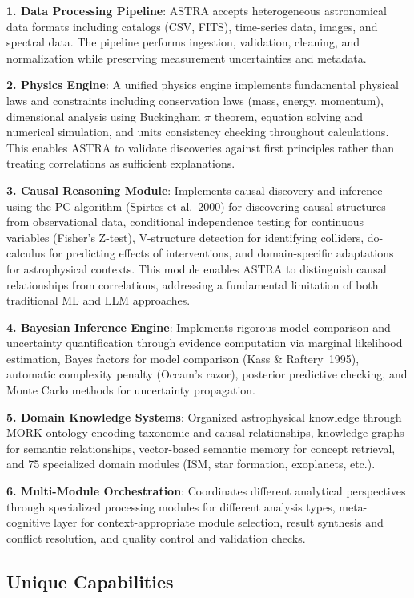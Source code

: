 \documentclass[usenatbib]{rasti}
\begin{document}
\textbf{1. Data Processing Pipeline}: ASTRA accepts heterogeneous astronomical data formats including catalogs (CSV, FITS), time-series data, images, and spectral data. The pipeline performs ingestion, validation, cleaning, and normalization while preserving measurement uncertainties and metadata.

\textbf{2. Physics Engine}: A unified physics engine implements fundamental physical laws and constraints including conservation laws (mass, energy, momentum), dimensional analysis using Buckingham $\pi$ theorem, equation solving and numerical simulation, and units consistency checking throughout calculations. This enables ASTRA to validate discoveries against first principles rather than treating correlations as sufficient explanations.

\textbf{3. Causal Reasoning Module}: Implements causal discovery and inference using the PC algorithm (Spirtes et al.~2000)\cite{spirtes2000} for discovering causal structures from observational data, conditional independence testing for continuous variables (Fisher's Z-test), V-structure detection for identifying colliders, do-calculus for predicting effects of interventions, and domain-specific adaptations for astrophysical contexts. This module enables ASTRA to distinguish causal relationships from correlations, addressing a fundamental limitation of both traditional ML and LLM approaches.

\textbf{4. Bayesian Inference Engine}: Implements rigorous model comparison and uncertainty quantification through evidence computation via marginal likelihood estimation, Bayes factors for model comparison (Kass \& Raftery~1995)\cite{kass1995}, automatic complexity penalty (Occam's razor), posterior predictive checking, and Monte Carlo methods for uncertainty propagation.

\textbf{5. Domain Knowledge Systems}: Organized astrophysical knowledge through MORK ontology encoding taxonomic and causal relationships, knowledge graphs for semantic relationships, vector-based semantic memory for concept retrieval, and 75 specialized domain modules (ISM, star formation, exoplanets, etc.).

\textbf{6. Multi-Module Orchestration}: Coordinates different analytical perspectives through specialized processing modules for different analysis types, meta-cognitive layer for context-appropriate module selection, result synthesis and conflict resolution, and quality control and validation checks.

\subsection{Unique Capabilities}
\end{document}
